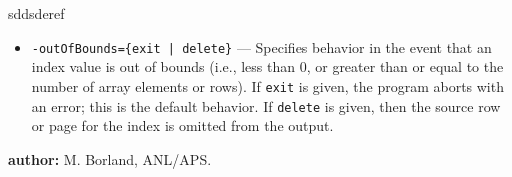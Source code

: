 \begin{sddsprog}{sddsderef}
\begin{itemize}
      \item \verb!-outOfBounds={exit | delete}! --- Specifies behavior in the event that an index value is out of bounds (i.e., less than 0, or greater than or equal to the number of array elements or rows). If \verb|exit| is given, the program aborts with an error; this is the default behavior. If \verb|delete| is given, then the source row or page for the index is omitted from the output.
    \end{itemize}
  \item \textbf{author:} M. Borland, ANL/APS.
\end{sddsprog}
